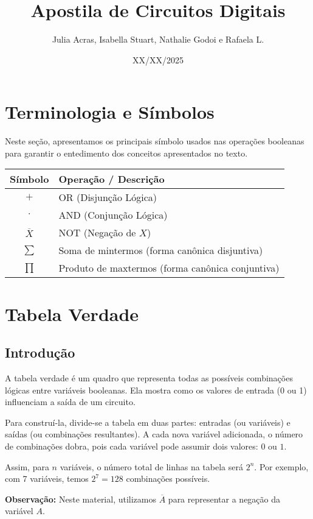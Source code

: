 \documentclass[12pt]{article}
\title{Apostila de Circuitos Digitais}
\author{Julia Acras, Isabella Stuart, Nathalie Godoi e Rafaela L.}
\date{XX/XX/2025}
\begin{document}
\maketitle

\tableofcontents
\clearpage

\section{Terminologia e Símbolos}
Neste seção, apresentamos os principais símbolo usados nas operações booleanas para garantir o entedimento dos conceitos apresentados no texto. 
\begin{center}
\begin{tabular}{|c|l|}
\hline
\textbf{Símbolo} & \textbf{Operação / Descrição} \\
\hline
$+$ & OR (Disjunção Lógica) \\
$\cdot$ & AND (Conjunção Lógica) \\
$\overline{X}$ & NOT (Negação de $X$) \\
$\sum$ & Soma de mintermos (forma canônica disjuntiva) \\
$\prod$ & Produto de maxtermos (forma canônica conjuntiva) \\
\hline
\end{tabular}
\end{center}


\section{Tabela Verdade}
\subsection{Introdução}
A tabela verdade é um quadro que representa todas as possíveis combinações lógicas entre variáveis booleanas. Ela mostra como os valores de entrada (0 ou 1) influenciam a saída de um circuito.

Para construí-la, divide-se a tabela em duas partes: entradas (ou variáveis) e saídas (ou combinações resultantes). A cada nova variável adicionada, o número de combinações dobra, pois cada variável pode assumir dois valores: \(0\) ou \(1\).

Assim, para \( n \) variáveis, o número total de linhas na tabela será \( 2^n \). Por exemplo, com 7 variáveis, temos \( 2^7 = 128 \) combinações possíveis.

\textbf{Observação:} Neste material, utilizamos \( \overline{A} \) para representar a negação da variável \( A \).
\end{document}
